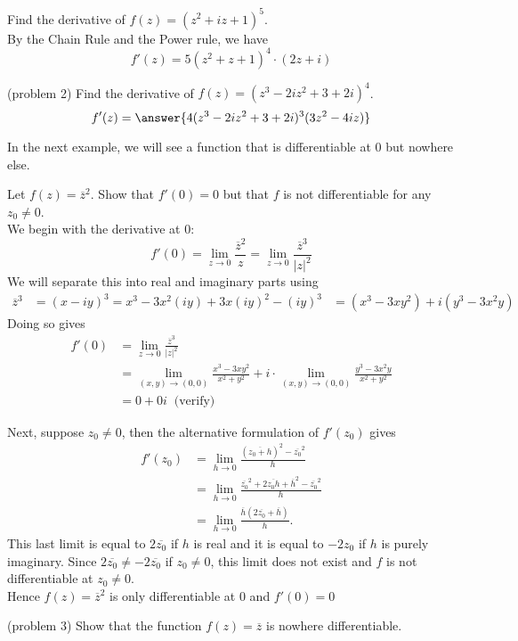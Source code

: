 \documentclass[handout]{ximera}
\begin{document}
\begin{example}[example 2]
Find the derivative of $f(z) = (z^2 + iz + 1)^5$.\\
By the Chain Rule and the Power rule, we have
\[
f'(z) = 5(z^2 + z + 1)^4 \cdot (2z +i)
\]
\end{example}

\begin{problem}(problem 2)
Find the derivative of $f(z) = (z^3 - 2iz^2 + 3 + 2i)^4$.\\
\[
f'(z) = \answer{4(z^3 - 2iz^2 + 3 + 2i)^3 (3z^2 -4iz)}
\]

\end{problem}
In the next example, we will see a function that is differentiable at $0$ but nowhere else.

\begin{example}[example 3]
Let $f(z) = \overline{z}^2$.  Show that $f'(0) = 0$ but that $f$ is not differentiable for any $z_0 \neq 0$.\\
We begin with the derivative at $0$:
\[
f'(0) = \lim_{z \to  0} \frac{\overline{z}^2}{z} = \lim_{z \to  0} \frac{\overline{z}^3}{|z|^2}
\]
We will separate this into real and imaginary parts using 
\begin{align*}
\overline{z}^3 &= (x -iy)^3 = x^3 - 3x^2(iy) + 3x(iy)^2  - (iy)^3 
              &= (x^3 -3xy^2) + i(y^3 - 3x^2y)
\end{align*}
Doing so gives
\begin{align*}
f'(0) &= \lim_{z \to  0} \frac{\overline{z}^3}{|z|^2}\\
      &= \lim_{(x,y) \to (0,0)} \frac{x^3 -3xy^2}{x^2 +y^2} + i\cdot \lim_{(x,y) \to (0,0)} \frac{y^3 - 3x^2y}{x^2 +y^2}\\
      & = 0 + 0i \;\; \mbox{(verify)}
\end{align*}

Next, suppose $z_0 \neq 0$, then the alternative formulation of $f'(z_0)$ gives
\begin{align*}
f'(z_0) &= \lim_{h \to 0} \frac{\left(\overline{z_0 + h}\right)^2-\overline{z_0}^2 }{h}\\[6pt]
        &=\lim_{h \to 0} \frac{\overline{z_0}^2 +2\overline{z_0h}+ \overline{h}^2 -\overline{z_0}^2 }{h}\\[6pt]
        &=\lim_{h \to 0} \frac{\overline{h} \left(2\overline{z_0}+ \overline{h}\right)}{h}.
\end{align*}
This last limit is equal to $2\overline{z_0}$ if $h$ is real and it is equal to $-2z_0$ if $h$ is purely imaginary.
Since $2\overline{z_0} \neq -2\overline{z_0}$ if $z_0 \neq 0$, this limit does not exist and $f$ is not differentiable at $z_0 \neq 0$.\\
Hence $f(z) = \overline{z}^2$ is only differentiable at $0$ and $f'(0) = 0$

\end{example}


\begin{problem}(problem 3)
Show that the function $f(z) = \overline{z}$ is nowhere differentiable.
\end{problem}
\end{document}
